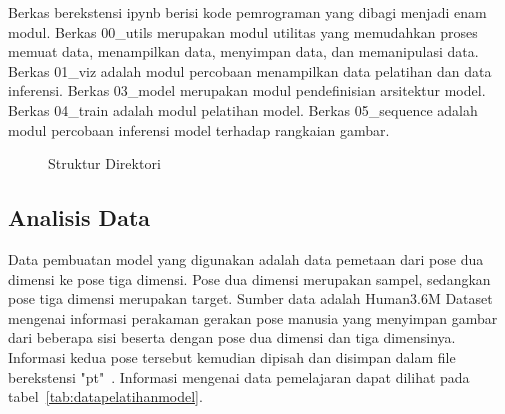 Berkas berekstensi ipynb berisi kode pemrograman yang dibagi menjadi enam modul.
Berkas 00\_utils merupakan modul utilitas yang memudahkan proses memuat data, menampilkan data, menyimpan data, dan memanipulasi data.
Berkas 01\_viz adalah modul percobaan menampilkan data pelatihan dan data inferensi.
Berkas 03\_model merupakan modul pendefinisian arsitektur model.
Berkas 04\_train adalah modul pelatihan model.
Berkas 05\_sequence adalah modul percobaan inferensi model terhadap rangkaian gambar.

\begin{figure}[htbp]
    \begin{center}
    \end{center}
    \vspace{-20pt}
    \captionsetup{labelfont=bf, textfont=bf}
    \caption{Struktur Direktori}
    \vspace{-10pt}
    \captionsetup{labelfont=md, textfont=md}
    \label{fig:strukturdirektori}
\end{figure}


\subsection{Analisis Data}

Data pembuatan model yang digunakan adalah data pemetaan dari pose dua dimensi ke pose tiga dimensi.
Pose dua dimensi merupakan sampel, sedangkan pose tiga dimensi merupakan target. Sumber data adalah
Human3.6M Dataset mengenai informasi perakaman gerakan pose manusia yang menyimpan gambar dari
beberapa sisi beserta dengan pose dua dimensi dan tiga dimensinya. Informasi kedua pose tersebut
kemudian dipisah dan disimpan dalam file berekstensi "pt"~\cite{h36m_pami}.
Informasi mengenai data pemelajaran dapat dilihat pada tabel~\ref{tab:datapelatihanmodel}.

